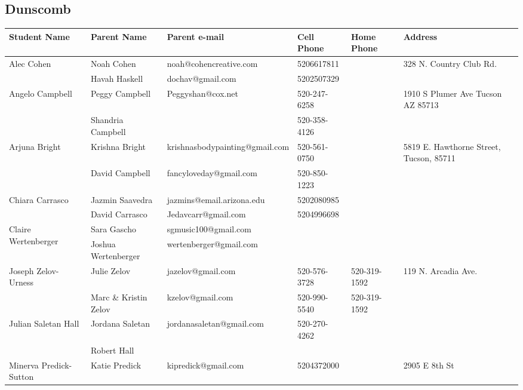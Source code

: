 \documentclass[landscape]{article}\usepackage[]{graphicx}\usepackage[]{color}
\begin{document}
\subsection{Dunscomb}
\begin{longtable}{|p{100pt}|p{100pt}|p{140pt}|p{60pt}|p{64pt}|p{120pt}|}
\textbf{Student Name} & \textbf{Parent Name} & \textbf{Parent e-mail} & \textbf{Cell Phone} & \textbf{Home Phone} & \textbf{Address}\\
\hline
\hline
\multirow{2}{100pt}{Alec Cohen} & Noah Cohen & noah@cohencreative.com & 5206617811 &  & \multirow{2}{120pt}{328 N. Country Club Rd.} \\
 & Havah Haskell & dochav@gmail.com & 5202507329 &  & \\
\hline
\multirow{2}{100pt}{Angelo Campbell} & Peggy Campbell  & Peggyshan@cox.net & 520-247-6258 &  & \multirow{2}{120pt}{1910 S Plumer Ave Tucson AZ 85713} \\
 & Shandria Campbell  &  & 520-358-4126 &  & \\
\hline
\multirow{2}{100pt}{Arjuna Bright} & Krishna Bright & krishnasbodypainting@gmail.com & 520-561-0750 &  & \multirow{2}{120pt}{5819 E. Hawthorne Street, Tucson, 85711} \\
 & David Campbell & fancyloveday@gmail.com & 520-850-1223 &  & \\
\hline
\multirow{2}{100pt}{Chiara Carrasco} & Jazmin Saavedra & jazmins@email.arizona.edu & 5202080985 &  & \multirow{2}{120pt}{} \\
 & David Carrasco & Jedavcarr@gmail.com & 5204996698 &  & \\
\hline
\multirow{2}{100pt}{Claire Wertenberger} & Sara Gascho & sgmusic100@gmail.com &  &  & \multirow{2}{120pt}{} \\
 & Joshua Wertenberger & wertenberger@gmail.com &  &  & \\
\hline
\multirow{2}{100pt}{Joseph Zelov-Urness} & Julie Zelov & jazelov@gmail.com & 520-576-3728 & 520-319-1592 & \multirow{2}{120pt}{119 N. Arcadia Ave.} \\
 & Marc \& Kristin Zelov & kzelov@gmail.com & 520-990-5540 & 520-319-1592 & \\
\hline
\multirow{2}{100pt}{Julian Saletan Hall} & Jordana Saletan & jordanasaletan@gmail.com & 520-270-4262 &  & \multirow{2}{120pt}{} \\
 & Robert Hall &  &  &  & \\
\hline
\multirow{2}{100pt}{Minerva Predick-Sutton} & Katie Predick & kipredick@gmail.com & 5204372000 &  & \multirow{2}{120pt}{2905 E 8th St} \\

\end{longtable}
\end{document}
